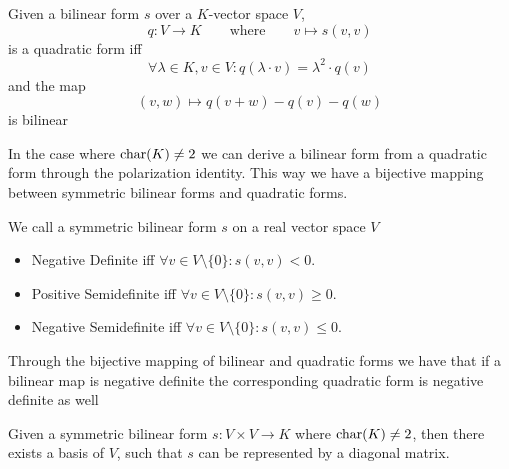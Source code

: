 \begin{definition}
   Given a bilinear form \(s\) over a \(K\)-vector space \(V\),
   \[q: V \to K \qquad\text{where}\qquad v \mapsto s(v, v)\]
   is a quadratic form iff
   \[\forall \lambda \in K, v \in V: q(\lambda \cdot v) = \lambda^2 \cdot q(v)\]
   and the map
   \[(v, w) \mapsto q(v + w) - q(v) - q(w)\]
   is bilinear
\end{definition}
\begin{remark}
   In the case where \(\operatorname{char}(K) \neq 2\) we can derive a bilinear form from a quadratic form through the polarization identity.
   This way we have a bijective mapping between symmetric bilinear forms and quadratic forms.
\end{remark}

\begin{definition}
   We call a symmetric bilinear form \(s\) on a real vector space \(V\)
   \begin{itemize}
      \item Negative Definite iff \(\forall v \in V \setminus \{0\}: s(v, v) < 0\).
      \item Positive Semidefinite iff \(\forall v \in V \setminus \{0\}: s(v, v) \geq 0\).
      \item Negative Semidefinite iff \(\forall v \in V \setminus \{0\}: s(v, v) \leq 0\).
   \end{itemize}
\end{definition}
\begin{remark}
   Through the bijective mapping of bilinear and quadratic forms we have that if a bilinear map is negative definite the corresponding quadratic form is negative definite as well
\end{remark}

\begin{proposition}\label{pro:diag_repr_mat}
   Given a symmetric bilinear form \(s: V \times V \to K\) where \(\operatorname{char}(K) \neq 2\), then there exists a basis of \(V\), such that \(s\) can be represented by a diagonal matrix.
\end{proposition}

